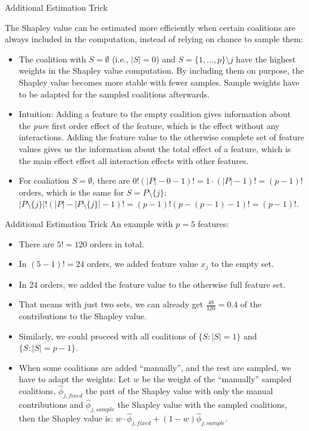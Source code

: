 \documentclass[11pt,compress,t,notes=noshow, aspectratio=169, xcolor=table]{beamer}
\begin{document}
\begin{vbframe}{Additional Estimation Trick}


  The Shapley value can be estimated more efficiently when certain coalitions are always included in the computation, instead of relying on chance to sample them:
  \vspace{0.25cm}
  \begin{itemize}
  \itemsep1em
    \item The coalition with $S = \emptyset$ (i.e., $|S| = 0$) and $S = \{1, \ldots, p\} \setminus j$ have the highest weights in the Shapley value computation. By including them on purpose, the Shapley value becomes more stable with fewer samples. Sample weights have to be adapted for the sampled coalitions afterwards.
    \item Intuition: Adding a feature to the empty coalition gives information about the \textit{pure} first order effect of the feature, which is the effect without any interactions. Adding the feature value to the otherwise complete set of feature values gives us the information about the total effect of a feature, which is the main effect effect all interaction effects with other features.
    \item For coaliation $S = \emptyset$, there are $0! (|P| - 0 - 1)! = 1 \cdot (|P| - 1)! = (p - 1)!$ orders, which is the same for $S = P \setminus \{j\}$: $|P \setminus \{j\}|! (|P| - |P \setminus \{j\}| - 1)! = (p - 1)! (p - (p-1) - 1)! = (p-1)!$.
\end{itemize}
 \end{vbframe}

\begin{vbframe}{Additional Estimation Trick}
An example with $p = 5$ features:
\vspace{0.25cm}
    \begin{itemize}
    \itemsep1em
        \item There are $5! = 120$ orders in total.
        \item In $(5 - 1)! = 24$ orders, we added feature value $x_j$ to the empty set.
        \item In 24 orders, we added the feature value to the otherwise full feature set.
        \item That means with just two sets, we can already get $\frac{48}{120} = 0.4$ of the contributions to the Shapley value.
        \item Similarly, we could proceed with all coalitions of $\{S: |S| = 1\}$ and $\{S: |S| = p - 1\}$.
        \item When some coalitions are added \enquote{manually}, and the rest are sampled, we have to adapt the weights: Let $w$ be the weight of the \enquote{manually} sampled coalitions, $\hat{\phi}_{j,fixed}$ the part of the Shapley value with only the manual contributions and $\hat{\phi}_{j,sample}$ the Shapley value with the sampled coalitions, then the Shapley value is: $w \cdot \hat{\phi}_{j,fixed} + (1 - w) \hat{\phi}_{j,sample}$.
  \end{itemize}
\end{vbframe}
\end{document}
